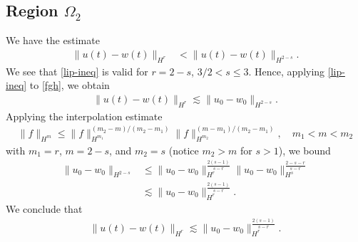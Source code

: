\subsection{Region $\Omega_{2}$} 
\label{ssec:case-4}
%
We have the estimate
\begin{equation}
\label{fgh}
\begin{split}
\| u(t) - w(t) \|_{H^{r}}
& < \|u(t) - w(t) \|_{H^{2-s}}.
\end{split}
\end{equation}
%
We see that \eqref{lip-ineq} is valid for $r = 2-s$, $3/2 < s \le 3$.
Hence, applying \eqref{lip-ineq} to \eqref{fgh}, we obtain 
%
%
%
%
\begin{equation*}
\begin{split}
\| u(t) - w(t) \|_{H^{r}}
\lesssim \|u_{0} - w_{0} \|_{H^{2-s}}.
\end{split}
\end{equation*}
%
%
%
%
%
Applying the interpolation estimate
%
%
%
%
%
%
%
%
\begin{equation}
  \label{interp}
\begin{split}
\| f \|_{H^{m}} \le \| f \|_{H^{m_{1}}}^{(m_{2}-m)/(m_{2} - m_{1})} \| f
\|_{H^{m_{2}}}^{(m -m_{1})/(m_{2} - m_{1})}, \quad m_{1} < m < m_{2}
\end{split}
\end{equation}
with $m_{1} =r$, $m = 2-s$, and $m_{2} = s$ (notice
$m_{2} > m$ for $s > 1$), we bound 
%
%
\begin{equation*}
\begin{split}
\| u_{0} - w_{0} \|_{H^{2-s}} 
& \le \| u_{0} - w_{0} \|_{H^{r}}^{\frac{2(s-1)}{s-r}} \| u_{0} - w_{0}
\|_{H^{s}}^{\frac{2-s-r}{s-r}}
\\
&  \lesssim \| u_{0} - w_{0} \|_{H^{r}}^{\frac{2(s-1)}{s-r}}.
\end{split}
\end{equation*}
%
We conclude that
%
%
\begin{equation*}
\begin{split}
\| u(t) - w(t) \|_{H^{r}} \lesssim \|u_{0} - w_{0} \|_{H^{r}}^{\frac{2(s-1)}{s-r}}.
\end{split}
\end{equation*}
%
%
%
%
